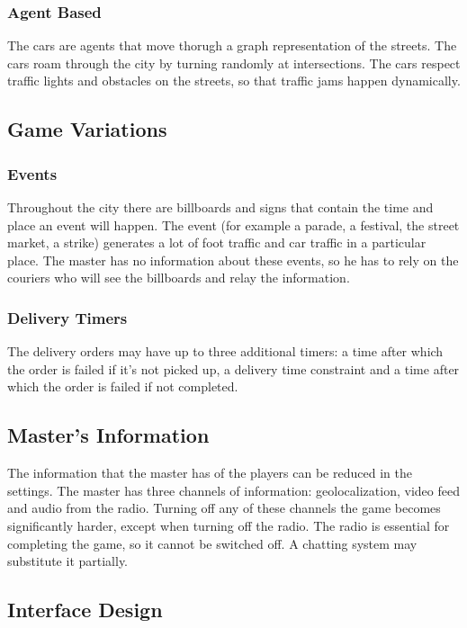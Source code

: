 \documentclass{article}
\begin{document}
\subsubsection{Agent Based}
The cars are agents that move thorugh a graph representation of the streets. The cars roam through the city by turning randomly at intersections. The cars respect traffic lights and obstacles on the streets, so that traffic jams happen dynamically.

\subsection{Game Variations}
\subsubsection{Events}
Throughout the city there are billboards and signs that contain the time and place an event will happen. The event (for example a parade, a festival, the street market, a strike) generates a lot of foot traffic and car traffic in a particular place. The master has no information about these events, so he has to rely on the couriers who will see the billboards and relay the information.
\subsubsection{Delivery Timers}
The delivery orders may have up to three additional timers: a time after which the order is failed if it's not picked up, a delivery time constraint and a time after which the order is failed if not completed.

\subsection{Master's Information}
The information that the master has of the players can be reduced in the settings. The master has three channels of information: geolocalization, video feed and audio from the radio. Turning off any of these channels the game becomes significantly harder, except when turning off the radio. The radio is essential for completing the game, so it cannot be switched off. A chatting system may substitute it partially.

\subsection{Interface Design}
\end{document}
